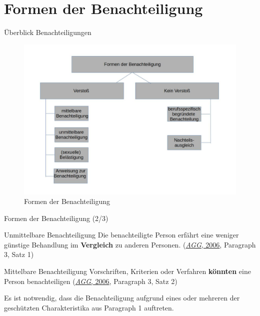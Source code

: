 \documentclass[
  10pt,
  ngerman,
  ignorenonframetext,
]{beamer}
\begin{document}
\hypertarget{formen-der-benachteiligung}{%
\section{Formen der Benachteiligung}\label{formen-der-benachteiligung}}

\begin{frame}{Überblick Benachteiligungen}
\protect\hypertarget{uxfcberblick-benachteiligungen}{}
\begin{figure}
\centering
\includegraphics[width=\textwidth,height=0.75\textheight]{plots/benachteiligung.jpg}
\caption{Formen der Benachteiligung}
\end{figure}
\end{frame}

\begin{frame}{Formen der Benachteiligung (2/3)}
\protect\hypertarget{formen-der-benachteiligung-23}{}
\begin{block}{Unmittelbare Benachteiligung}
\protect\hypertarget{unmittelbare-benachteiligung}{}
Die benachteiligte Person erfährt eine weniger günstige Behandlung im
\textbf{Vergleich} zu anderen Personen.
(\protect\hyperlink{ref-agg}{\emph{AGG}, 2006}, Paragraph 3, Satz 1)
\end{block}

\begin{block}{Mittelbare Benachteiligung}
\protect\hypertarget{mittelbare-benachteiligung}{}
Vorschriften, Kriterien oder Verfahren \textbf{könnten} eine Person
benachteiligen (\protect\hyperlink{ref-agg}{\emph{AGG}, 2006}, Paragraph
3, Satz 2)

Es ist notwendig, dass die Benachteiligung aufgrund eines oder mehreren
der geschützten Charakteristika aus Paragraph 1 auftreten.
\end{block}
\end{frame}
\end{document}
